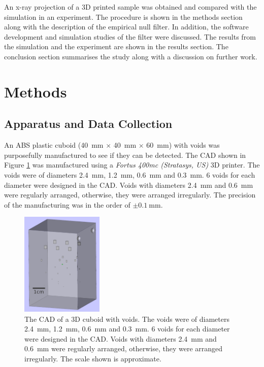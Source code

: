 \documentclass{proc}
\begin{document}
An x-ray projection of a 3D printed sample was obtained and compared with the simulation in an experiment. The procedure is shown in the methods section along with the description of the empirical null filter. In addition, the software development and simulation studies of the filter were discussed. The results from the simulation and the experiment are shown in the results section. The conclusion section summarises the study along with a discussion on further work.

\section{Methods}

\subsection{Apparatus and Data Collection}

An ABS plastic cuboid (\SI{40}{\milli\metre} $\times$ \SI{40}{\milli\metre} $\times$ \SI{60}{\milli\metre}) with voids was purposefully manufactured to see if they can be detected. The CAD shown in Figure \ref{fig:inference_testObject} was manufactured using a \emph{Fortus 400mc (Stratasys, US)} 3D printer. The voids were of diameters \SI{2.4}{\milli\metre}, \SI{1.2}{\milli\metre}, \SI{0.6}{\milli\metre} and \SI{0.3}{\milli\metre}. 6 voids for each diameter were designed in the CAD. Voids with diameters \SI{2.4}{\milli\metre} and \SI{0.6}{\milli\metre} were regularly arranged, otherwise, they were arranged irregularly. The precision of the manufacturing was in the order of $\pm\SI{0.1}{\milli\metre}$.

\begin{figure}
  \centering
  \includegraphics[width=0.35\textwidth]{../figures/inference/TestObject.png}
  \caption{The CAD of a 3D cuboid with voids. The voids were of diameters \SI{2.4}{\milli\metre}, \SI{1.2}{\milli\metre}, \SI{0.6}{\milli\metre} and \SI{0.3}{\milli\metre}. 6 voids for each diameter were designed in the CAD. Voids with diameters \SI{2.4}{\milli\metre} and \SI{0.6}{\milli\metre} were regularly arranged, otherwise, they were arranged irregularly. The scale shown is approximate.}
  \label{fig:inference_testObject}
\end{figure}
\end{document}
